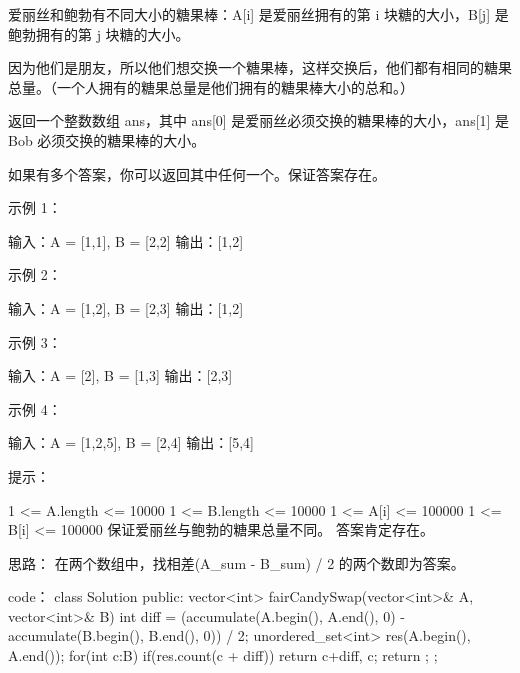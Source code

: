 爱丽丝和鲍勃有不同大小的糖果棒：A[i] 是爱丽丝拥有的第 i 块糖的大小，B[j] 是鲍勃拥有的第 j 块糖的大小。

因为他们是朋友，所以他们想交换一个糖果棒，这样交换后，他们都有相同的糖果总量。（一个人拥有的糖果总量是他们拥有的糖果棒大小的总和。）

返回一个整数数组 ans，其中 ans[0] 是爱丽丝必须交换的糖果棒的大小，ans[1] 是 Bob 必须交换的糖果棒的大小。

如果有多个答案，你可以返回其中任何一个。保证答案存在。

 

示例 1：

输入：A = [1,1], B = [2,2]
输出：[1,2]

示例 2：

输入：A = [1,2], B = [2,3]
输出：[1,2]

示例 3：

输入：A = [2], B = [1,3]
输出：[2,3]

示例 4：

输入：A = [1,2,5], B = [2,4]
输出：[5,4]

 

提示：

    1 <= A.length <= 10000
    1 <= B.length <= 10000
    1 <= A[i] <= 100000
    1 <= B[i] <= 100000
    保证爱丽丝与鲍勃的糖果总量不同。
    答案肯定存在。























思路：
在两个数组中，找相差(A_sum - B_sum) / 2 的两个数即为答案。


















code：
class Solution {
public:
    vector<int> fairCandySwap(vector<int>& A, vector<int>& B) {
        int diff = (accumulate(A.begin(), A.end(), 0) - accumulate(B.begin(), B.end(), 0)) / 2;
        unordered_set<int> res(A.begin(), A.end());
        for(int c:B)
        {
            if(res.count(c + diff))
                return {c+diff, c};
        }
        return {};
    }
};